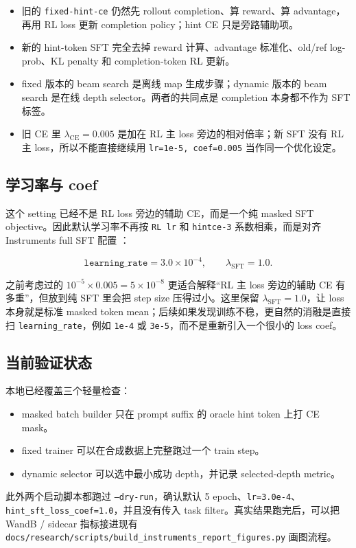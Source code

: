 \begin{itemize}
\item 旧的 \texttt{fixed-hint-ce} 仍然先 rollout completion、算 reward、算 advantage，再用 RL loss 更新 completion policy；hint CE 只是旁路辅助项。
\item 新的 hint-token SFT 完全去掉 reward 计算、advantage 标准化、old/ref log-prob、KL penalty 和 completion-token RL 更新。
\item fixed 版本的 beam search 是离线 map 生成步骤；dynamic 版本的 beam search 是在线 depth selector。两者的共同点是 completion 本身都不作为 SFT 标签。
\item 旧 CE 里 \(\lambda_{\text{CE}}=0.005\) 是加在 RL 主 loss 旁边的相对倍率；新 SFT 没有 RL 主 loss，所以不能直接继续用 \texttt{lr=1e-5, coef=0.005} 当作同一个优化设定。
\end{itemize}

\subsection{学习率与 coef}

这个 setting 已经不是 RL loss 旁边的辅助 CE，而是一个纯 masked SFT objective。因此默认学习率不再按
\texttt{RL lr} 和 \texttt{hintce-3} 系数相乘，而是对齐 Instruments full SFT 配置
：

\[
\texttt{learning\_rate}=3.0\times10^{-4},
\qquad
\lambda_{\text{SFT}}=1.0.
\]

之前考虑过的 \(10^{-5}\times0.005=5\times10^{-8}\) 更适合解释“RL 主 loss 旁边的辅助 CE 有多重”，但放到纯 SFT 里会把 step size 压得过小。这里保留 \(\lambda_{\text{SFT}}=1.0\)，让 loss 本身就是标准 masked token mean；后续如果发现训练不稳，更自然的消融是直接扫 \texttt{learning\_rate}，例如 \texttt{1e-4} 或 \texttt{3e-5}，而不是重新引入一个很小的 loss coef。

\subsection{当前验证状态}

本地已经覆盖三个轻量检查：

\begin{itemize}
\item masked batch builder 只在 prompt suffix 的 oracle hint token 上打 CE mask。
\item fixed trainer 可以在合成数据上完整跑过一个 train step。
\item dynamic selector 可以选中最小成功 depth，并记录 selected-depth metric。
\end{itemize}

此外两个启动脚本都跑过 \texttt{--dry-run}，确认默认 5 epoch、\texttt{lr=3.0e-4}、\texttt{hint\_sft\_loss\_coef=1.0}，并且没有传入 task filter。真实结果跑完后，可以把 WandB / sidecar 指标接进现有 \texttt{docs/research/scripts/build\_instruments\_report\_figures.py} 画图流程。
